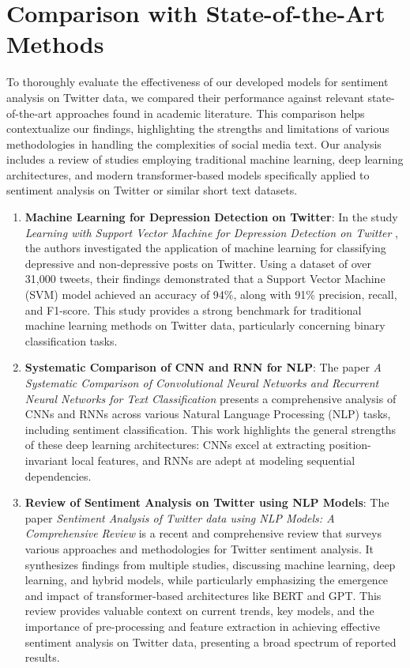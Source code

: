 \section{Comparison with State-of-the-Art Methods}

To thoroughly evaluate the effectiveness of our developed models for sentiment analysis on Twitter data, we compared their performance against relevant state-of-the-art approaches found in academic literature. This comparison helps contextualize our findings, highlighting the strengths and limitations of various methodologies in handling the complexities of social media text. Our analysis includes a review of studies employing traditional machine learning, deep learning architectures, and modern transformer-based models specifically applied to sentiment analysis on Twitter or similar short text datasets.

\begin{enumerate}
\item \textbf{Machine Learning for Depression Detection on Twitter}: In the study \textit{Learning with Support Vector Machine for Depression Detection on Twitter} \cite{costa2021image}, the authors investigated the application of machine learning for classifying depressive and non-depressive posts on Twitter. Using a dataset of over 31,000 tweets, their findings demonstrated that a Support Vector Machine (SVM) model achieved an accuracy of 94\%, along with 91\% precision, recall, and F1-score. This study provides a strong benchmark for traditional machine learning methods on Twitter data, particularly concerning binary classification tasks.

\item \textbf{Systematic Comparison of CNN and RNN for NLP}: The paper \textit{A Systematic Comparison of Convolutional Neural Networks and Recurrent Neural Networks for Text Classification} \cite{zhou2017systematic} presents a comprehensive analysis of CNNs and RNNs across various Natural Language Processing (NLP) tasks, including sentiment classification. This work highlights the general strengths of these deep learning architectures: CNNs excel at extracting position-invariant local features, and RNNs are adept at modeling sequential dependencies. 

\item \textbf{Review of Sentiment Analysis on Twitter using NLP Models}: The paper \textit{Sentiment Analysis of Twitter data using NLP Models: A Comprehensive Review} \cite{prabhakar2024sentiment} is a recent and comprehensive review that surveys various approaches and methodologies for Twitter sentiment analysis. It synthesizes findings from multiple studies, discussing machine learning, deep learning, and hybrid models, while particularly emphasizing the emergence and impact of transformer-based architectures like BERT and GPT. This review provides valuable context on current trends, key models, and the importance of pre-processing and feature extraction in achieving effective sentiment analysis on Twitter data, presenting a broad spectrum of reported results.
\end{enumerate}

